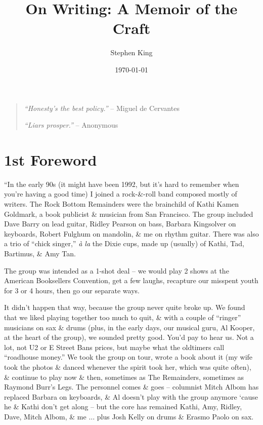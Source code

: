 \documentclass{article}
\title{On Writing: A Memoir of the Craft}
\author{Stephen King}
\date{\today}
\numberwithin{equation}{section}
\begin{document}
\maketitle
\tableofcontents
\vspace{5mm}
\begin{quotation}
	\textit{``Honesty's the best policy.''} -- Miguel de Cervantes
	
	\textit{``Liars prosper.''} -- Anonymous
\end{quotation}


\section*{1st Foreword}
``In the early 90s (it might have been 1992, but it's hard to remember when you're having a good time) I joined a rock-\&-roll band composed mostly of writers. The Rock Bottom Remainders were the brainchild of Kathi Kamen Goldmark, a book publicist \& musician from San Francisco. The group included Dave Barry on lead guitar, Ridley Pearson on bass, Barbara Kingsolver on keyboards, Robert Fulghum on mandolin, \& me on rhythm guitar. There was also a trio of ``chick singer,'' \textit{\`a la} the Dixie cups, made up (usually) of Kathi, Tad, Bartimus, \& Amy Tan.

The group was intended as a 1-shot deal -- we would play 2 shows at the American Booksellers Convention, get a few laughs, recapture our misspent youth for 3 or 4 hours, then go our separate ways.

It didn't happen that way, because the group never quite broke up. We found that we liked playing together too much to quit, \& with a couple of ``ringer'' musicians on sax \& drums (plus, in the early days, our musical guru, Al Kooper, at the heart of the group), we sounded pretty good. You'd pay to hear us. Not a lot, not U2 or E Street Bans prices, but maybe what the oldtimers call ``roadhouse money.'' We took the group on tour, wrote a book about it (my wife took the photos \& danced whenever the spirit took her, which was quite often), \& continue to play now \& then, sometimes as The Remainders, sometimes as Raymond Burr's Legs. The personnel comes \& goes -- columnist Mitch Albom has replaced Barbara on keyboards, \& Al doesn't play with the group anymore `cause he \& Kathi don't get along -- but the core has remained Kathi, Amy, Ridley, Dave, Mitch Albom, \& me $\ldots$ plus Josh Kelly on drums \& Erasmo Paolo on sax.
\end{document}
